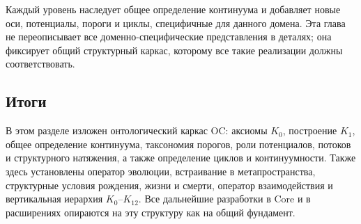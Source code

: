 Каждый уровень наследует общее определение континуума и добавляет новые оси,
потенциалы, пороги и циклы, специфичные для данного домена.
Эта глава не переописывает все доменно-специфические представления в деталях;
она фиксирует общий структурный каркас, которому все такие реализации должны соответствовать.

\subsection{Итоги}

В этом разделе изложен онтологический каркас OC:
аксиомы \(K_0\), построение \(K_1\), общее определение континуума,
таксономия порогов, роли потенциалов, потоков и структурного натяжения,
а также определение циклов и континуумности.
Также здесь установлены оператор эволюции, встраивание в метапространства,
структурные условия рождения, жизни и смерти, оператор взаимодействия и
вертикальная иерархия \(K_0\)–\(K_{12}\).
Все дальнейшие разработки в Core и в расширениях опираются на эту структуру
как на общий фундамент.
